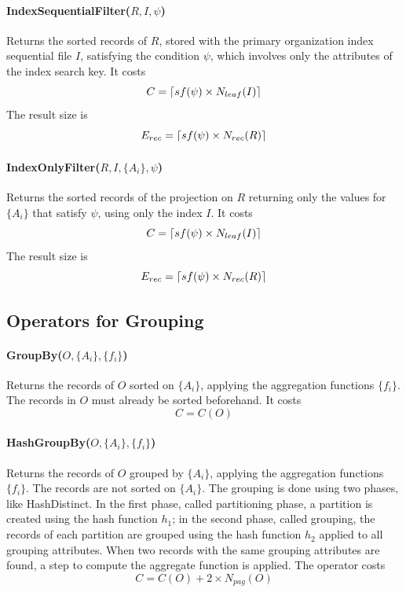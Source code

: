 \paragraph{IndexSequentialFilter($R,I,\psi$)}
Returns the sorted records of $R$, stored with the primary organization index sequential file $I$, satisfying the condition $\psi$, which involves only the attributes of the index search key. It costs
\begin{equation*}
    C = \left\lceil sf(\psi) \times N_{leaf}(I)\right\rceil
\end{equation*}
The result size is
\begin{equation*}
    E_{rec} = \left\lceil sf(\psi) \times N_{rec}(R)\right\rceil
\end{equation*}

\paragraph{IndexOnlyFilter($R, I, \{A_i\}, \psi$)}
Returns the sorted records of the projection on $R$ returning only the values for $\{A_i\}$ that satisfy $\psi$, using only the index $I$. It costs
\begin{equation*}
    C = \left\lceil sf(\psi) \times N_{leaf}(I)\right\rceil
\end{equation*}
The result size is
\begin{equation*}
    E_{rec} = \left\lceil sf(\psi) \times N_{rec}(R)\right\rceil
\end{equation*}

\subsection{Operators for Grouping}

\paragraph{GroupBy($O, \{A_i\}, \{f_i\}$)}
Returns the records of $O$ sorted on $\{A_i\}$, applying the aggregation functions $\{f_i\}$. The records in $O$ must already be sorted beforehand. It costs
\begin{equation*}
    C = C(O)
\end{equation*}

\paragraph{HashGroupBy($O, \{A_i\}, \{f_i\}$)}
Returns the records of $O$ grouped by $\{A_i\}$, applying the aggregation functions $\{f_i\}$. The records are not sorted on $\{A_i\}$. The grouping is done using two phases, like HashDistinct. In the first phase, called partitioning phase, a partition is created using the hash function $h_1$; in the second phase, called grouping, the records of each partition are grouped using the hash function $h_2$ applied to all grouping attributes. When two records with the same grouping attributes are found, a step to compute the aggregate function is applied. The operator costs
\begin{equation*}
    C = C(O) + 2 \times N_{pag}(O)
\end{equation*}

